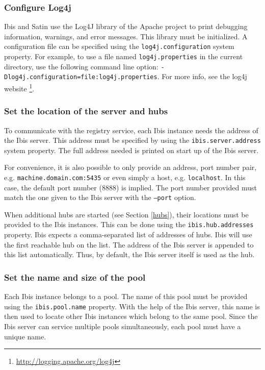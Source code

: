 \documentclass[a4paper,10pt]{article}
\begin{document}
\subsubsection{Configure Log4j}

Ibis and Satin use the Log4J library of the Apache project to print debugging
information, warnings, and error messages. This library must be
initialized. A configuration file can be specified using the
\texttt{log4j.configuration} system property. For example, to use a file
named \texttt{log4j.properties} in the current directory, use the
following command line option:
\texttt{-Dlog4j.configuration=file:log4j.properties}. For more info,
see the log4j website \footnote{\url{http://logging.apache.org/log4j}}.

\subsubsection{Set the location of the server and hubs}

To communicate with the registry service, each Ibis instance needs the address
of the Ibis server. This address must be specified by using the
\texttt{ibis.server.address} system property. The full address needed is
printed on start up of the Ibis server.

For convenience, it is also possible to only provide an address, port number
pair, e.g. \texttt{machine.domain.com:5435} or even simply a host, e.g.
\texttt{localhost}. In this case, the default port number (8888) is implied.
The port number provided must match the one given to the Ibis server
with the \texttt{--port} option.

When additional hubs are started (see Section \ref{hubs}), their locations
must be provided to the Ibis instances. This can be done using
the \texttt{ibis.hub.addresses} property. Ibis expects a comma-separated
list of addresses of hubs. Ibis will use the first reachable hub on the
list. The address of the Ibis server is appended to this list
automatically. Thus, by default, the Ibis server itself is used as the
hub.

\subsubsection{Set the name and size of the pool}

Each Ibis instance belongs to a pool. The name of this pool must be provided
using the \texttt{ibis.pool.name} property. With the help of the Ibis server,
this name is then used to locate other Ibis instances which belong to the
same pool. Since the Ibis server can service multiple pools simultaneously,
each pool must have a unique name.
\end{document}
